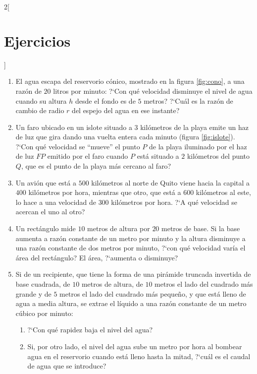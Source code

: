 \begin{multicols}{2}[\section{Ejercicios}]
\begingroup\small
\begin{enumerate}[leftmargin=*]
\item\label{ex:dcRCCono} El agua escapa del reservorio cónico, mostrado en la figura
    \ref{fig:cono}, a una razón de $20$ litros por minuto: ?`Con qué velocidad disminuye el
    nivel de agua cuando su altura $h$ desde el fondo es de $5$ metros? ?`Cuál es la razón de
    cambio de radio $r$ del espejo del agua en ese instante?

\item\label{ex:dcRCIslote} Un faro ubicado en un islote situado a $3$ kilómetros de la playa
    emite un haz de luz que gira dando una vuelta entera cada minuto (figura \ref{fig:islote}).
    ?`Con qué velocidad se ``mueve'' el punto $P$ de la playa iluminado por el haz de luz $FP$
    emitido por el faro cuando $P$ está situado a $2$ kilómetros del punto $Q$, que es el punto
    de la playa más cercano al faro?

\item Un avión que está a $500$ kilómetros al norte de Quito viene hacia la capital a $400$
    kilómetros por hora, mientras que otro, que está a $600$ kilómetros al este, lo hace a una
    velocidad de $300$ kilómetros por hora. ?`A qué velocidad se acercan el uno al otro?

\item Un rectángulo mide $10$ metros de altura por $20$ metros de base. Si la base aumenta a
    razón constante de un metro por minuto y la altura disminuye a una razón constante de dos
    metros por minuto, ?`con qué velocidad varía el área del rectángulo? El área, ?`aumenta o
    disminuye?

\item Si de un recipiente, que tiene la forma de una pirámide truncada invertida de base
    cuadrada, de $10$ metros de altura, de $10$ metros el lado del cuadrado más grande y de $5$
    metros el lado del cuadrado más pequeño, y que está lleno de agua a media altura, se extrae
    el líquido a una razón constante de un metro cúbico por minuto:
    \begin{enumerate}[leftmargin=*]
    \item ?`Con qué rapidez baja el nivel del agua?
    \item Si, por otro lado, el nivel del agua sube un metro por hora al bombear agua en el
        reservorio cuando está lleno hasta la mitad, ?`cuál es el caudal de agua que se
        introduce?
    \end{enumerate}


\end{enumerate}
\end{multicols}
